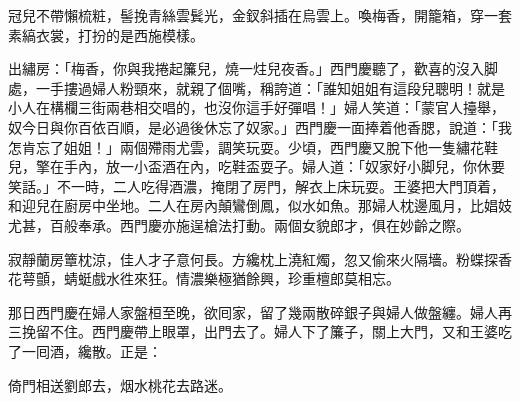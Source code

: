 冠兒不帶懶梳粧，髻挽青絲雲鬂光，金釵斜插在烏雲上。喚梅香，開籠箱，穿一套素縞衣裳，打扮的是西施模樣。

出繡房：「梅香，你與我捲起簾兒，燒一炷兒夜香。」{}西門慶聽了，歡喜的沒入脚處，一手摟過婦人粉頸來，就親了個嘴，稱誇道：「誰知姐姐有這段兒聰明！就是小人在構欄三街兩巷相交唱的，也沒你這手好彈唱！」婦人笑道：「蒙官人擡舉，奴今日與你百依百順，是必過後休忘了奴家。」西門慶一面捧着他香腮，說道：「我怎肯忘了姐姐！」兩個殢雨尤雲，調笑玩耍。少頃，西門慶又脫下他一隻繡花鞋兒，擎在手內，放一小盃酒在內，吃鞋盃耍子。{}婦人道：「奴家好小脚兒，你休要笑話。」不一時，二人吃得酒濃，掩閉了房門，解衣上床玩耍。王婆把大門頂着，和迎兒在廚房中坐地。二人在房內顛鸞倒鳳，似水如魚。那婦人枕邊風月，比娼妓尤甚，百般奉承。西門慶亦施逞槍法打動。兩個女貌郎才，俱在妙齡之際。

寂靜蘭房簟枕涼，佳人才子意何長。方纔枕上澆紅燭，忽又偷來火隔墻。粉蝶探香花萼顫，蜻蜓戲水徃來狂。情濃樂極猶餘興，珍重檀郎莫相忘。

那日西門慶在婦人家盤桓至晚，欲囘家，留了幾兩散碎銀子與婦人做盤纏。婦人再三挽留不住。西門慶帶上眼罩，出門去了。婦人下了簾子，關上大門，又和王婆吃了一囘酒，纔散。正是：

倚門相送劉郎去，烟水桃花去路迷。

